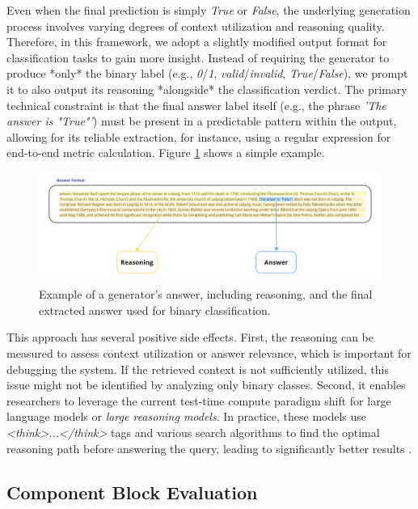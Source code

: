 Even when the final prediction is simply \textit{True} or \textit{False}, the underlying generation process involves varying degrees of context utilization and reasoning quality. Therefore, in this framework, we adopt a slightly modified output format for classification tasks to gain more insight. Instead of requiring the generator to produce *only* the binary label (e.g., \textit{0}/\textit{1}, \textit{valid}/\textit{invalid}, \textit{True}/\textit{False}), we prompt it to also output its reasoning *alongside* the classification verdict. The primary technical constraint is that the final answer label itself (e.g., the phrase \textit{'The answer is "True"'}) must be present in a predictable pattern within the output, allowing for its reliable extraction, for instance, using a regular expression for end-to-end metric calculation. Figure \ref{fig:answerreason} shows a simple example.

\begin{figure}[!ht]
  \centering
  \includegraphics[width=\textwidth]{images/Answer-vs-Reasoning.pdf}
  \caption{Example of a generator's answer, including reasoning, and the final extracted answer used for binary classification.}
  \label{fig:answerreason}
\end{figure}

This approach has several positive side effects. First, the reasoning can be measured to assess context utilization or answer relevance, which is important for debugging the system. If the retrieved context is not sufficiently utilized, this issue might not be identified by analyzing only binary classes. Second, it enables researchers to leverage the current test-time compute paradigm shift for large language models or \textit{large reasoning models}. In practice, these models use \textit{<think>...</think>} tags and various search algorithms to find the optimal reasoning path before answering the query, leading to significantly better results \cite{Xu.16.01.2025}.


\subsection{Component Block Evaluation}

